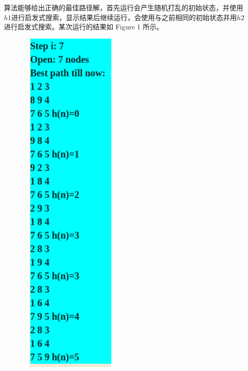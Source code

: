算法能够给出正确的最佳路径解，首先运行会产生随机打乱的初始状态，并使用$h1$进行启发式搜索，显示结果后继续运行，会使用与之前相同的初始状态并用$h2$进行启发式搜索。某次运行的结果如 Figure 1 所示。
\begin{figure}
\centering
\includegraphics[width=2in, height=7in]{h1.png}

\end{figure}

